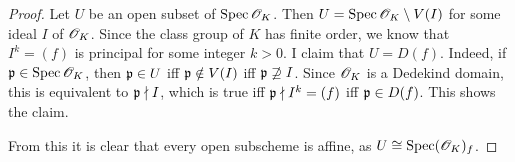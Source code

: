 \begin{proof}
	Let $U$ be an open subset of $\operatorname{Spec} \mathscr{O}_K$. Then $U = \operatorname{Spec} \mathscr{O}_K \setminus V(I)$ for some ideal $I$ of $\mathscr{O}_K$. Since the class group of $K$ has finite order, we know that $I^k = (f)$ is principal for some integer $k > 0$. I claim that $U = D(f)$. Indeed, if $\mathfrak{p} \in \operatorname{Spec} \mathscr{O}_K$, then $\mathfrak{p} \in U$ iff $\mathfrak{p} \notin V(I)$ iff $\mathfrak{p} \not\supseteq I$. Since $\mathscr{O}_K$ is a Dedekind domain, this is equivalent to $\mathfrak{p} \nmid I$, which is true iff $\mathfrak{p} \nmid I^k = (f)$ iff $\mathfrak{p} \in D(f)$. This shows the claim.
	
	From this it is clear that every open subscheme is affine, as $U \cong \operatorname{Spec} (\mathscr{O}_K)_{f}$.
\end{proof}
